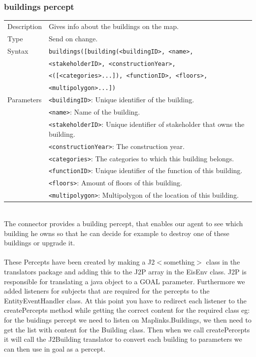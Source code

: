 	\subsubsection*{buildings percept}
		\begin{small}
			\begin{tabular}{p{2cm}p{9cm}}
				Description 	& Gives info about the buildings on the map.\\
				Type 		& Send on change.\\
				Syntax 	& \verb|buildings([building(<buildingID>, <name>, |\\
					 	& \verb|<stakeholderID>, <constructionYear>, |\\
					 	& \verb|<([<categories>...]), <functionID>, <floors>, |\\
					 	& \verb|<multipolygon>...]) |\\
				Parameters 	& \verb|<buildingID>|: Unique identifier of the building.\\
						& \verb|<name>|: Name of the building.\\
						& \verb|<stakeholderID>|:  Unique identifier of stakeholder that owns the building.\\
						& \verb|<constructionYear>|: The construction year.\\
						& \verb|<categories>|: The categories to which this building belongs.\\
						& \verb|<functionID>|: Unique identifier of the function of this building.\\
						& \verb|<floors>|: Amount of floors of this building.\\
						& \verb|<multipolygon>|: Multipolygon of the location of this building.\\
			\end{tabular}
		\end{small}
	\\The connector provides a building percept, that enables our agent to see which building he owns so that he can decide for example to destroy one of these buildings or upgrade it.
\\
\\
These Percepts have been created by making a J2$<$something$>$ class in the translators package and adding this to the J2P array in the EisEnv class. J2P is responsible for translating a java object to a GOAL parameter. Furthermore we added listeners for subjects that are required for the percepts to the EntityEventHandler class. At this point you have to redirect each listener to the createPercepts method while getting the correct content for the required class eg: for the buidings percept we need to listen on Maplinks.Buildings, we then need to get the list with content for the Building class. Then when we call createPercepts it will call the J2Building translator to convert each building to parameters we can then use in goal as a percept.

